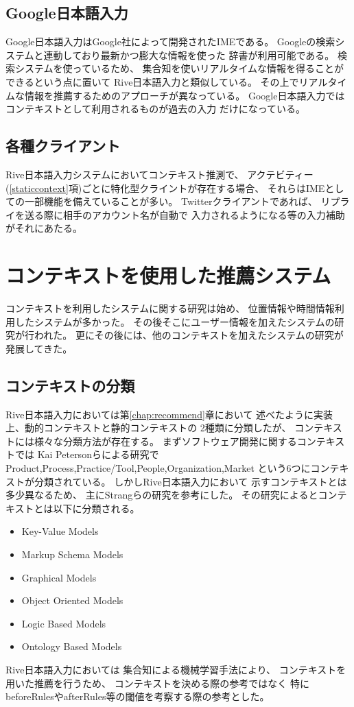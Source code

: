 \subsection{Google日本語入力}
Google日本語入力はGoogle社によって開発されたIMEである。
Googleの検索システムと連動しており最新かつ膨大な情報を使った
辞書が利用可能である。
検索システムを使っているため、
集合知を使いリアルタイムな情報を得ることができるという点に置いて
Rive日本語入力と類似している。
その上でリアルタイムな情報を推薦するためのアプローチが異なっている。
Google日本語入力ではコンテキストとして利用されるものが過去の入力
だけになっている。

\subsection{各種クライアント}
Rive日本語入力システムにおいてコンテキスト推測で、
アクテビティー(\ref{staticcontext}項)ごとに特化型クライントが存在する場合、
それらはIMEとしての一部機能を備えていることが多い。
Twitterクライアントであれば、
リプライを送る際に相手のアカウント名が自動で
入力されるようになる等の入力補助がそれにあたる。

\section{コンテキストを使用した推薦システム}
コンテキストを利用したシステムに関する研究は始め、
位置情報や時間情報利用したシステムが多かった。
その後そこにユーザー情報を加えたシステムの研究が行われた。
更にその後には、他のコンテキストを加えたシステムの研究が発展してきた。
\cite{okukenta}

\subsection{コンテキストの分類}
Rive日本語入力においては第\ref{chap:recommend}章において
述べたように実装上、動的コンテキストと静的コンテキストの
2種類に分類したが、
コンテキストには様々な分類方法が存在する。
まずソフトウェア開発に関するコンテキストでは
Kai Petersonらによる研究で\cite{KAIPETERSON}
Product,Process,Practice/Tool,People,Organization,Market
という6つにコンテキストが分類されている。
しかしRive日本語入力において
示すコンテキストとは多少異なるため、
主にStrangらの研究\cite{contextsurvey}を参考にした。
その研究によるとコンテキストとは以下に分類される。
\begin{itemize}
  \item Key-Value Models
  \item Markup Schema Models
  \item Graphical Models
  \item Object Oriented Models
  \item Logic Based Models
  \item Ontology Based Models
\end{itemize}
Rive日本語入力においては
集合知による機械学習手法により、
コンテキストを用いた推薦を行うため、
コンテキストを決める際の参考ではなく
特にbeforeRulesやafterRules等の閾値を考察する際の参考とした。

